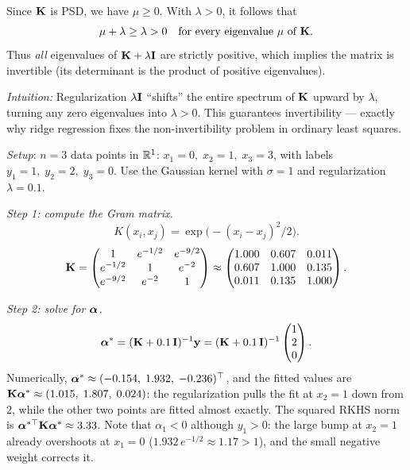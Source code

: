 \begin{notechapter}
\begin{intuition}
Since $\mathbf{K}$ is PSD, we have $\mu \ge 0$. With $\lambda > 0$,
it follows that
\[
\mu + \lambda \ge \lambda > 0 \quad \text{for every eigenvalue $\mu$ of $\mathbf{K}$}.
\]
Thus \emph{all} eigenvalues of $\mathbf{K} + \lambda\mathbf{I}$
are strictly positive, which implies the matrix is invertible
(its determinant is the product of positive eigenvalues).

\smallskip
\emph{Intuition:} Regularization $\lambda\mathbf{I}$ ``shifts'' the entire
spectrum of $\mathbf{K}$ upward by $\lambda$, turning any zero eigenvalues
into $\lambda > 0$. This guarantees invertibility --- exactly why ridge
regression fixes the non-invertibility problem in ordinary least squares.
\end{intuition}

\begin{example}
\emph{Setup}: $n = 3$ data points in $\mathbb{R}^1$: $x_1 = 0,\; x_2 = 1,\;
x_3 = 3$, with labels $y_1 = 1,\; y_2 = 2,\; y_3 = 0$. Use the Gaussian
kernel with $\sigma = 1$ and regularization $\lambda = 0.1$.

\emph{Step 1: compute the Gram matrix.}
\[
K(x_i, x_j) = \exp\!\bigl(-(x_i - x_j)^2/2\bigr).
\]
\[
\mathbf{K} = \begin{pmatrix}
1 & e^{-1/2} & e^{-9/2} \\
e^{-1/2} & 1 & e^{-2} \\
e^{-9/2} & e^{-2} & 1
\end{pmatrix}
\approx \begin{pmatrix}
1.000 & 0.607 & 0.011 \\
0.607 & 1.000 & 0.135 \\
0.011 & 0.135 & 1.000
\end{pmatrix}.
\]

\emph{Step 2: solve for $\boldsymbol{\alpha}$.}
\[
\boldsymbol{\alpha}^* = (\mathbf{K} + 0.1\,\mathbf{I})^{-1}\mathbf{y} = (\mathbf{K} +
0.1\,\mathbf{I})^{-1}\begin{pmatrix}1\\2\\0\end{pmatrix}.
\]
Numerically, $\boldsymbol{\alpha}^* \approx (-0.154,\; 1.932,\; -0.236)^\top$, and the fitted values are $\mathbf{K}\boldsymbol{\alpha}^* \approx (1.015,\; 1.807,\; 0.024)$: the regularization pulls the fit at $x_2 = 1$ down from $2$, while the other two points are fitted almost exactly. The squared RKHS norm is $\boldsymbol{\alpha}^{*\top}\mathbf{K}\boldsymbol{\alpha}^* \approx 3.33$. Note that $\alpha_1 < 0$ although $y_1 > 0$: the large bump at $x_2 = 1$ already overshoots at $x_1 = 0$ ($1.932\,e^{-1/2} \approx 1.17 > 1$), and the small negative weight corrects it.


\end{example}
\end{notechapter}
